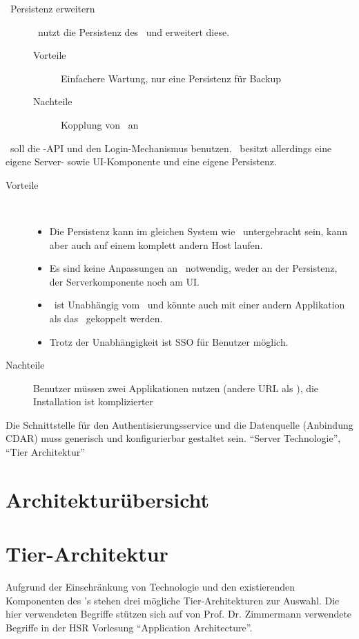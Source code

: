 {{\begin{description}
					\item[\cdar\ Persistenz erweitern]
					\eeppi\ nutzt die Persistenz des \cdar\ und erweitert diese.
					\begin{description}
						\item[Vorteile] Einfachere Wartung, nur eine Persistenz für Backup
						\item[Nachteile] Kopplung von \eeppi\ an \cdar
					\end{description}
				\end{description}
			}
			{
				\eeppi\ soll die \cdar-API und den Login-Mechanismus benutzen. \eeppi\ besitzt allerdings eine eigene Server- sowie UI-Komponente und eine eigene Persistenz. 
				\begin{description}
					\item[Vorteile] \
						\begin{itemize}
							\item Die Persistenz kann im gleichen System wie \cdar\ untergebracht sein, kann aber auch auf einem komplett andern Host laufen.
							\item Es sind keine Anpassungen an \cdar\ notwendig, weder an der Persistenz, der Serverkomponente noch am UI.
							\item \eeppi\ ist Unabhängig vom \cdar\ und könnte auch mit einer andern Applikation als das \cdar\ gekoppelt werden.
							\item Trotz der Unabhängigkeit ist SSO für Benutzer möglich.
						\end{itemize}
					\item[Nachteile] Benutzer müssen zwei Applikationen nutzen (andere URL als \cdar), die Installation ist komplizierter
				\end{description}}
			{}
			{Die Schnittstelle für den Authentisierungsservice und die Datenquelle (Anbindung CDAR) muss generisch und konfigurierbar gestaltet sein.}
			{"`Server Technologie"', "`Tier Architektur"'}
		}
		

	\section{Architekturübersicht}
	
	
	\section{Tier-Architektur}
		Aufgrund der Einschränkung von Technologie und den existierenden Komponenten des \cdar's stehen drei mögliche Tier-Architekturen zur Auswahl.
		Die hier verwendeten Begriffe stützen sich auf von Prof. Dr. Zimmermann verwendete Begriffe in der HSR Vorlesung "`Application Architecture"'\cite{prof._dr._zimmerman_layers_20144}.		
		
